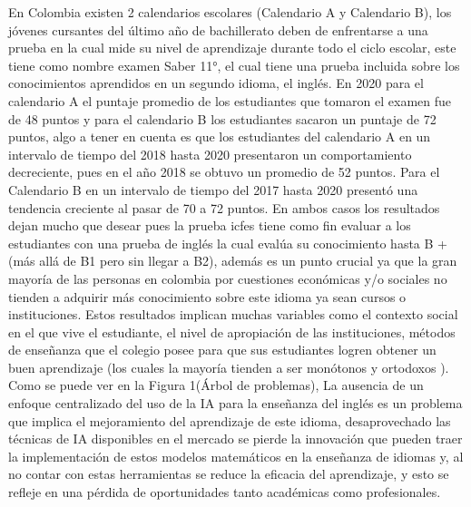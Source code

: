 En Colombia existen 2 calendarios escolares (Calendario A y Calendario B),  los jóvenes cursantes del último año de bachillerato deben de enfrentarse a una prueba en la cual mide su nivel de aprendizaje durante todo el ciclo escolar, este tiene como nombre examen Saber 11°, el cual tiene una prueba incluida sobre los conocimientos aprendidos en un segundo idioma, el inglés. En 2020 para el calendario A el puntaje promedio de los estudiantes que tomaron el examen fue de 48 puntos y para el calendario B los estudiantes sacaron un puntaje de 72 puntos, algo a tener en cuenta es que los estudiantes del calendario A en un intervalo de tiempo del 2018 hasta 2020 presentaron un comportamiento decreciente, pues en el año 2018 se obtuvo un promedio de 52 puntos. \cite{icfes2022informe} Para el Calendario B en un intervalo de tiempo del 2017 hasta 2020 presentó una tendencia creciente al pasar de 70 a 72 puntos. En ambos casos los resultados dejan mucho que desear pues la prueba icfes tiene como fin evaluar a los estudiantes con una prueba de inglés la cual evalúa su conocimiento  hasta B + (más allá de B1 pero sin llegar a B2)\cite{molina2021gamificacion}, además es un punto crucial ya que la gran mayoría de las personas en colombia por cuestiones económicas y/o sociales no tienden a adquirir más conocimiento sobre este idioma ya sean cursos o instituciones. Estos resultados implican muchas variables como el contexto social en el que vive el estudiante, el nivel de apropiación de las instituciones, métodos de enseñanza que el colegio posee para que sus estudiantes logren obtener un buen aprendizaje (los cuales la mayoría tienden a ser monótonos y ortodoxos ). Como se puede ver en la Figura 1(Árbol de problemas), La ausencia de un enfoque centralizado del uso de la IA para la enseñanza del inglés es un problema que implica el mejoramiento del aprendizaje de este idioma, desaprovechado las técnicas de IA disponibles en el mercado se pierde la innovación que pueden traer la implementación de estos modelos matemáticos en la enseñanza de idiomas y, al no contar con estas herramientas se reduce la eficacia del aprendizaje, y esto se refleje en una pérdida de oportunidades tanto académicas como profesionales.
\\
\\
